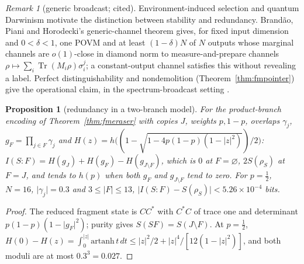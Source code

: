 \documentclass[aps,pra,onecolumn,superscriptaddress,nofootinbib,10pt]{revtex4-2}
\newtheorem{proposition}[theorem]{Proposition}
\theoremstyle{definition}
\theoremstyle{remark}
\newtheorem{remark}[theorem]{Remark}
\newcommand{\tr}{\operatorname{Tr}}
\begin{document}
\begin{remark}[generic broadcast; cited]\label{rem:fmbph}
Environment-induced selection and quantum Darwinism \cite{n2-zurek81,n2-zurek09,n2-blumekohout}
motivate the distinction between stability and redundancy.  Brand\~ao, Piani and Horodecki's
generic-channel theorem \cite[Thm.~1]{n2-bph} gives, for fixed input dimension and $0<\delta<1$, one POVM and at
least $(1-\delta)N$ of $N$ outputs whose marginal channels are $o(1)$-close in diamond norm to measure-and-prepare channels
$\rho\mapsto\sum_i\tr(M_i\rho)\sigma_i^j$; a constant-output channel satisfies this without revealing a label.  Perfect distinguishability
and nondemolition (Theorem~\ref{thm:fmpointer}) give the operational claim, in the spectrum-broadcast setting
\cite{n2-horodecki}.
\end{remark}

\begin{proposition}[redundancy in a two-branch model]\label{prop:fmredundancy}
For the product-branch encoding of Theorem~\ref{thm:fmeraser} with copies $J$, weights $p,1-p$, overlaps $\gamma_j$, $g_F=\prod_{j\in F}\gamma_j$ and
$H(z)=h\bigl((1-\sqrt{1-4p(1-p)(1-\lvert z\rvert^2)})/2\bigr)$: $I(S{:}F)=H(g_J)+H(g_F)-H(g_{J\setminus F})$, which is $0$ at $F=\varnothing$, $2S(\rho_S)$ at $F=J$, and tends to $h(p)$ when both
$g_F$ and $g_{J\setminus F}$ tend to zero.  For $p=\tfrac12$, $N=16$, $\lvert\gamma_j\rvert=0.3$ and $3\le\lvert F\rvert\le13$, $\lvert I(S{:}F)-S(\rho_S)\rvert<5.26\times10^{-4}$ bits.
\end{proposition}
\begin{proof}
The reduced fragment state is $CC^*$ with $C^*C$ of trace one and determinant $p(1-p)(1-\lvert g_F\rvert^2)$; purity gives $S(SF)=S(J\setminus F)$.  At
$p=\tfrac12$, $H(0)-H(z)=\int_0^{\lvert z\rvert}\mathrm{artanh}\,t\,dt\le\lvert z\rvert^2/2+\lvert z\rvert^4/[12(1-\lvert z\rvert^2)]$, and both moduli are at most $0.3^3=0.027$.
\end{proof}
\end{document}
